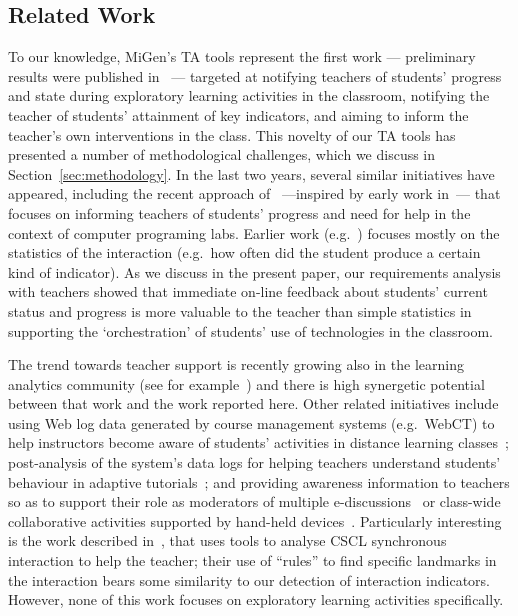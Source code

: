 \subsection{Related Work}
\label{sec:related}

To our knowledge, MiGen's TA tools represent the first work ---
preliminary results were published in~\cite{TA-ECTEL} --- 
targeted at notifying teachers of students' progress and state during
exploratory learning activities in the classroom, notifying the
teacher of students' attainment of key indicators, and aiming to
inform the teacher's own interventions in the class. This novelty of
our TA tools has presented a number of methodological challenges,
which we discuss in Section~\ref{sec:methodology}. 
In the last two years, several similar
initiatives have appeared, including the recent approach
of~\cite{Gutierrez12} ---inspired by early work
in~\cite{Yardi08}--- that focuses on 
informing teachers of students' progress and need for help 
in the context of computer programing labs.
Earlier work (e.g.~\cite{Gueraud09}) focuses mostly on the statistics
 of the interaction (e.g.~how often did the student produce a certain
 kind of indicator). As we discuss in the present paper, our requirements
 analysis with teachers showed that immediate on-line feedback
 about students' current status and progress
 is more valuable to the teacher than simple statistics in supporting the
 `orchestration' of students' use of technologies in the classroom. 

The trend towards teacher support is recently growing 
also in the learning analytics community
(see for example~\cite{Crespo12,Zaldivar12,Pardo12}) and there is high
synergetic potential between that work and the work reported here.
Other related initiatives include 
using Web log data generated by course management systems
(e.g.~WebCT) to help instructors become aware of students'
activities in distance learning classes~\cite{Mazza07}; post-analysis of
the system's data logs for helping teachers understand students'
behaviour in adaptive tutorials~\cite{BenAnim08}; 
and providing
awareness information to teachers so as to support their role as 
moderators of multiple e-discussions~\cite{Wichmann09} or class-wide
collaborative activities supported by hand-held devices~\cite{CortezNussbaum2009}. 
%
Particularly interesting is the work described 
in~\cite{Avouris08}, that uses tools to analyse CSCL 
synchronous interaction to help the teacher; their use of ``rules'' to
find specific landmarks in the interaction bears some
similarity to our detection of interaction indicators.  
%
However, none of this work
focuses on exploratory learning activities specifically. 


